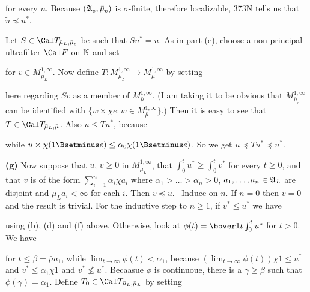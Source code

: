 {
\noindent for every $n$.   Because $(\frak A_e,\bar\mu_e)$ is
$\sigma$-finite, therefore localizable, 373N tells us that $\tilde
u\preccurlyeq u^*$.
     
Let $S\in\Cal T_{\bar\mu_L,\bar\mu_e}$ be such that $Su^*=\tilde u$.
As in part (e), choose a non-principal ultrafilter $\Cal F$ on $\Bbb N$
and set
     
     
\noindent for $v\in M^{1,\infty}_{\bar\mu_L}$.   Now define
$T:M^{1,\infty}_{\bar\mu_L}\to M^{1,\infty}_{\bar\mu}$ by setting
     
     
\noindent here regarding $Sv$ as a member of $M^{1,\infty}_{\bar\mu}$.
(I am taking it to be obvious that $M^{1,\infty}_{\bar\mu_e}$ can be
identified with $\{w\times\chi e:w\in M^{1,\infty}_{\bar\mu}\}$.)   Then
it is easy to see that $T\in\Cal T_{\bar\mu_L,\bar\mu}$.   Also $u\le
Tu^*$, because
     
     
\noindent while $u\times\chi(1\Bsetminus e)\le\alpha_0\chi(1\Bsetminus
e)$.    So we get $u\preccurlyeq Tu^*\preccurlyeq u^*$.\ \Qed
     
\medskip
     
{\bf (g)} Now suppose that $u$, $v\ge 0$ in $M^{1,\infty}_{\bar\mu_L}$,
that $\int_0^tu^*\ge\int_0^tv^*$ for every $t\ge 0$, and that $v$ is of
the form $\sum_{i=1}^n\alpha_i\chi a_i$ where
$\alpha_1>\ldots>\alpha_n>0$, $a_1,\ldots,a_n\in\frak A_L$ are disjoint
and $\bar\mu_La_i<\infty$ for each $i$.
Then $v\preccurlyeq u$.   \Prf\ Induce on $n$.   If $n=0$ then $v=0$ and
the result is trivial.   For the inductive step to $n\ge 1$, if $v^*\le
u^*$ we have
     
     
\noindent using (b), (d) and (f) above.   Otherwise, look at
$\phi(t)=\bover1t\int_0^tu^*$ for $t>0$.   We have
     
     
\noindent for $t\le \beta=\bar\mu a_1$, while
$\lim_{t\to\infty}\phi(t)<\alpha_1$, because
$(\lim_{t\to\infty}\phi(t))\chi 1\le u^*$ and $v^*\le\alpha_1\chi 1$ and
$v^*\not\le u^*$.   Becaasue $\phi$ is continuoue, there is a
$\gamma\ge\beta$ such that
$\phi(\gamma)=\alpha_1$.   Define $T_0\in\Cal T_{\bar\mu_L,\bar\mu_L}$
by setting
     
}
